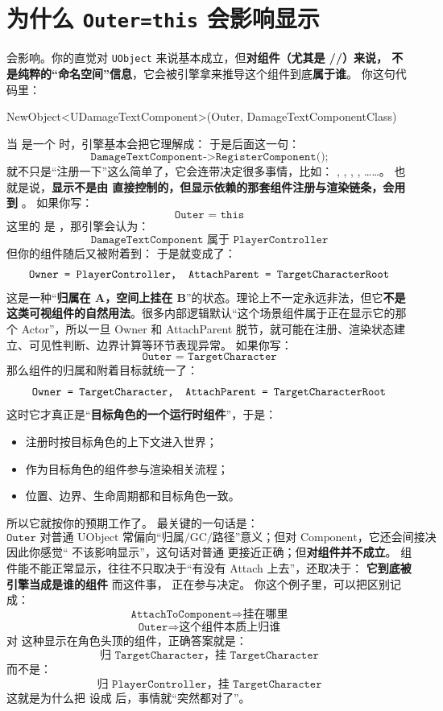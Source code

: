\documentclass[10pt,CJKmath]{ctexart}
\begin{document}
\section{为什么 \texttt{Outer=this} 会影响显示}
会影响。你的直觉对 \texttt{UObject} 来说基本成立，但\textbf{对组件（尤其是 //）来说， 不是纯粹的“命名空间”信息}，它会被引擎拿来推导这个组件到底\textbf{属于谁}。
你这句代码里：
 \begin{code}
 NewObject<UDamageTextComponent>(Outer, DamageTextComponentClass)
 \end{code} 
当  是一个  时，引擎基本会把它理解成：
于是后面这一句：
\[ \texttt{DamageTextComponent->RegisterComponent();} \]
就不只是“注册一下”这么简单了，它会连带决定很多事情，比如：
 , , , , ……。
也就是说，\textbf{显示不是由  直接控制的，但显示依赖的那套组件注册与渲染链条，会用到 }。
如果你写：
\[ \texttt{Outer = this} \]
这里的  是 ，那引擎会认为：
\[ \texttt{DamageTextComponent 属于 PlayerController} \]
但你的组件随后又被附着到：
于是就变成了：
\[ \texttt{Owner = PlayerController,\quad AttachParent = TargetCharacterRoot} \]
这是一种“\textbf{归属在 A，空间上挂在 B}”的状态。理论上不一定永远非法，但它\textbf{不是这类可视组件的自然用法}。很多内部逻辑默认“这个场景组件属于正在显示它的那个 Actor”，所以一旦 Owner 和 AttachParent 脱节，就可能在注册、渲染状态建立、可见性判断、边界计算等环节表现异常。
如果你写：
\[ \texttt{Outer = TargetCharacter} \]
那么组件的归属和附着目标就统一了：
\[ \texttt{Owner = TargetCharacter,\quad AttachParent = TargetCharacterRoot} \]
这时它才真正是“\textbf{目标角色的一个运行时组件}”，于是：
\begin{itemize} 
	\item 注册时按目标角色的上下文进入世界； 
	\item 作为目标角色的组件参与渲染相关流程； 
	\item 位置、边界、生命周期都和目标角色一致。 
\end{itemize}
所以它就按你的预期工作了。
最关键的一句话是：
\[\boxed{\texttt{Outer} \text{ 对普通 UObject 常偏向“归属/GC/路径”意义；但对 Component，它还会间接决定 Owner 与注册上下文。}} \]
因此你感觉“ 不该影响显示”，这句话对普通  更接近正确；但\textbf{对组件并不成立}。
组件能不能正常显示，往往不只取决于“有没有 Attach 上去”，还取决于：
 \textbf{它到底被引擎当成是谁的组件} 
而这件事， 正在参与决定。
你这个例子里，可以把区别记成：
\[ \texttt{AttachToComponent} \Rightarrow \text{挂在哪里} \]
\[ \texttt{Outer} \Rightarrow \text{这个组件本质上归谁} \]
对  这种显示在角色头顶的组件，正确答案就是：
\[ \boxed{\texttt{归 TargetCharacter，挂 TargetCharacter}} \]
而不是：
\[ \texttt{归 PlayerController，挂 TargetCharacter} \]
这就是为什么把  设成  后，事情就“突然都对了”。	
\end{document}
